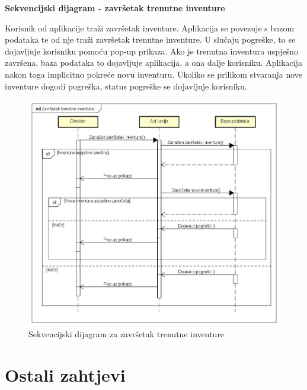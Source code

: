 			\textbf{Sekvencijski dijagram - završetak trenutne inventure}
			
			Korisnik od aplikacije traži završetak inventure. Aplikacija se povezuje s bazom podataka te od nje traži završetak trenutne inventure. U slučaju pogreške, to se dojavljuje korisniku pomoću pop-up prikaza. Ako je trenutna inventura uspješno završena, baza podataka to dojavljuje aplikacija, a ona dalje korisniku. Aplikacija nakon toga implicitno pokreće novu inventuru. Ukoliko se prilikom stvaranja nove inventure dogodi pogreška, status pogreške se dojavljuje korisniku.
			
			\begin{figure}[H]
				\includegraphics[scale=0.5]{slike/Sekvencijski dijagram.jpg}
				\caption{Sekvencijski dijagram za završetak trenutne inventure}
			\end{figure}
	
		\section{Ostali zahtjevi}
		
